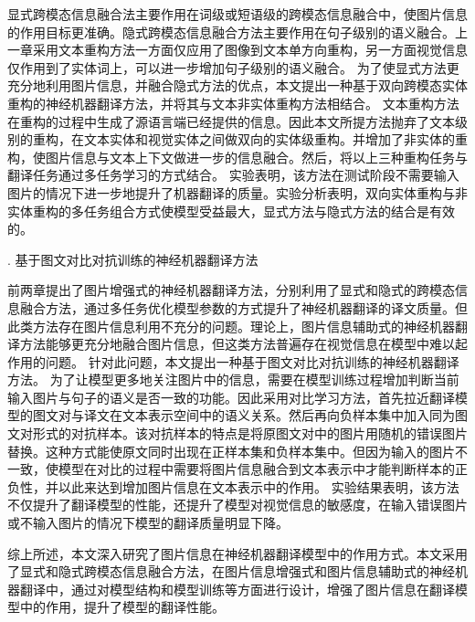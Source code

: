 显式跨模态信息融合法主要作用在词级或短语级的跨模态信息融合中，使图片信息的作用目标更准确。隐式跨模态信息融合方法主要作用在句子级别的语义融合。上一章采用文本重构方法一方面仅应用了图像到文本单方向重构，另一方面视觉信息仅作用到了实体词上，可以进一步增加句子级别的语义融合。
为了使显式方法更充分地利用图片信息，并融合隐式方法的优点，本文提出一种基于双向跨模态实体重构的神经机器翻译方法，并将其与文本非实体重构方法相结合。
文本重构方法在重构的过程中生成了源语言端已经提供的信息。因此本文所提方法抛弃了文本级别的重构，在文本实体和视觉实体之间做双向的实体级重构。并增加了非实体的重构，使图片信息与文本上下文做进一步的信息融合。然后，将以上三种重构任务与翻译任务通过多任务学习的方式结合。
实验表明，该方法在测试阶段不需要输入图片的情况下进一步地提升了机器翻译的质量。实验分析表明，双向实体重构与非实体重构的多任务组合方式使模型受益最大，显式方法与隐式方法的结合是有效的。

{. 基于图文对比对抗训练的神经机器翻译方法}

前两章提出了图片增强式的神经机器翻译方法，分别利用了显式和隐式的跨模态信息融合方法，通过多任务优化模型参数的方式提升了神经机器翻译的译文质量。但此类方法存在图片信息利用不充分的问题。理论上，图片信息辅助式的神经机器翻译方法能够更充分地融合图片信息，但这类方法普遍存在视觉信息在模型中难以起作用的问题。
针对此问题，本文提出一种基于图文对比对抗训练的神经机器翻译方法。
为了让模型更多地关注图片中的信息，需要在模型训练过程增加判断当前输入图片与句子的语义是否一致的功能。因此采用对比学习方法，首先拉近翻译模型的图文对与译文在文本表示空间中的语义关系。然后再向负样本集中加入同为图文对形式的对抗样本。该对抗样本的特点是将原图文对中的图片用随机的错误图片替换。这种方式能使原文同时出现在正样本集和负样本集中。但因为输入的图片不一致，使模型在对比的过程中需要将图片信息融合到文本表示中才能判断样本的正负性，并以此来达到增加图片信息在文本表示中的作用。
实验结果表明，该方法不仅提升了翻译模型的性能，还提升了模型对视觉信息的敏感度，在输入错误图片或不输入图片的情况下模型的翻译质量明显下降。

综上所述，本文深入研究了图片信息在神经机器翻译模型中的作用方式。本文采用了显式和隐式跨模态信息融合方法，在图片信息增强式和图片信息辅助式的神经机器翻译中，通过对模型结构和模型训练等方面进行设计，增强了图片信息在翻译模型中的作用，提升了模型的翻译性能。


